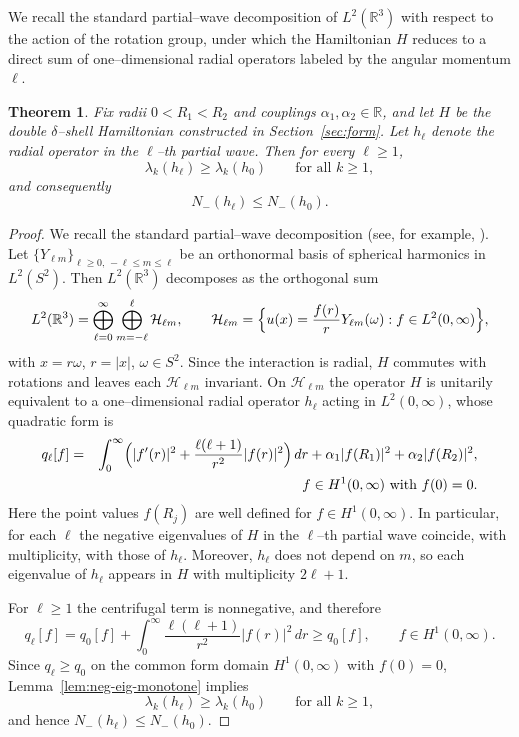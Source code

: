 \documentclass[a4paper,11pt]{article}
\numberwithin{equation}{section}
\newtheorem{thm}{Theorem}
\theoremstyle{definition}
\theoremstyle{remark}
\begin{document}
We recall the standard partial--wave decomposition of $L^2(\mathbb R^3)$ with
respect to the action of the rotation group, under which the Hamiltonian $H$
reduces to a direct sum of one--dimensional radial operators labeled by the
angular momentum $\ell$.

\begin{thm}\label{thm:partial-waves}
Fix radii $0<R_1<R_2$ and couplings $\alpha_1,\alpha_2\in\mathbb R$, and let $H$
be the double $\delta$--shell Hamiltonian constructed in Section~\ref{sec:form}.
Let $h_\ell$ denote the radial operator in the $\ell$--th partial wave.
Then for every $\ell\ge1$,
$$
\lambda_k(h_\ell)\ge \lambda_k(h_0)\qquad\text{for all }k\ge1,
$$
and consequently
$$
N_-(h_\ell)\le N_-(h_0).
$$
\end{thm}

\begin{proof}
We recall the standard partial--wave decomposition (see, for example,
\cite[Sec.~II.2]{AGHH}).
Let $\{Y_{\ell m}\}_{\ell\ge0,\,-\ell\le m\le\ell}$ be an orthonormal basis of
spherical harmonics in $L^2(S^2)$.
Then $L^2(\mathbb R^3)$ decomposes as the orthogonal sum
$$
L^2(\mathbb R^3)
=
\bigoplus_{\ell=0}^\infty
\bigoplus_{m=-\ell}^{\ell}
\mathcal H_{\ell m},
\qquad
\mathcal H_{\ell m}
=
\Bigl\{u(x)=\frac{f(r)}{r}Y_{\ell m}(\omega): f\in L^2(0,\infty)\Bigr\},
$$
with $x=r\omega$, $r=|x|$, $\omega\in S^2$.
Since the interaction is radial, $H$ commutes with rotations and leaves each
$\mathcal H_{\ell m}$ invariant.
On $\mathcal H_{\ell m}$ the operator $H$ is unitarily equivalent to a
one--dimensional radial operator $h_\ell$ acting in $L^2(0,\infty)$, whose
quadratic form is
\begin{eqnarray*}
q_\ell[f]
&=&
\int_0^\infty\Bigl(|f'(r)|^2+\frac{\ell(\ell+1)}{r^2}|f(r)|^2\Bigr)\,dr
+\alpha_1|f(R_1)|^2+\alpha_2|f(R_2)|^2,\\
&& \qquad f\in H^1(0,\infty)\ \text{with } f(0)=0.
\end{eqnarray*}
Here the point values $f(R_j)$ are well defined for $f\in H^1(0,\infty)$.
In particular, for each $\ell$ the negative eigenvalues of $H$ in the
$\ell$--th partial wave coincide, with multiplicity, with those of $h_\ell$.
Moreover, $h_\ell$ does not depend on $m$, so each eigenvalue of $h_\ell$
appears in $H$ with multiplicity $2\ell+1$.

For $\ell\ge1$ the centrifugal term is nonnegative, and therefore
$$
q_\ell[f]
=
q_0[f]+\int_0^\infty\frac{\ell(\ell+1)}{r^2}|f(r)|^2\,dr
\ge
q_0[f],\qquad f\in H^1(0,\infty).
$$
Since $q_\ell\ge q_0$ on the common form domain $H^1(0,\infty)$ with $f(0)=0$,
Lemma~\ref{lem:neg-eig-monotone} implies
$$
\lambda_k(h_\ell)\ge \lambda_k(h_0)\qquad\text{for all }k\ge1,
$$
and hence $N_-(h_\ell)\le N_-(h_0)$.
\end{proof}
\end{document}
